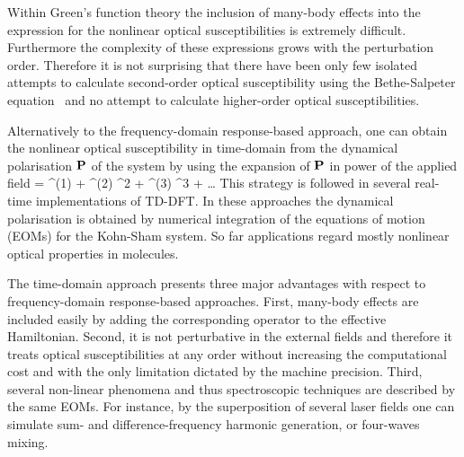 Within Green's function theory the inclusion of many-body effects into the expression for the nonlinear optical susceptibilities is extremely difficult. 
Furthermore the complexity of these expressions grows with the perturbation order. Therefore it is not surprising that there have been only few isolated attempts to calculate second-order optical susceptibility using the Bethe-Salpeter equation~\cite{Leitsmann2005,Chang2002} and no attempt to calculate higher-order optical susceptibilities.~\cite{PhysRevB.80.165318} 

Alternatively to the frequency-domain response-based approach, one can obtain the nonlinear optical susceptibility in time-domain from the dynamical polarisation ${\bf P}$ of the system by using the expansion of ${\bf P}$ in power of the applied field
\be
\label{eq:peopbf}
\PP= \chi^{(1)} \efield + \chi^{(2)} \efield^2 + \chi^{(3)} \efield^3 + \dots 
\ee 
This strategy is followed in several real-time implementations of TD-DFT\cite{PhysRevB.54.4484}. In these approaches the dynamical polarisation is obtained by numerical integration of the equations of motion (EOMs) for the Kohn-Sham system.\cite{takimoto:154114,castro:3425,meng:054110} So far applications regard mostly nonlinear optical properties in molecules.  

 
The time-domain approach presents three major advantages with respect to frequency-domain response-based approaches. First, many-body effects are included easily by adding the corresponding operator to the effective Hamiltonian. Second, it is not perturbative in the external fields and therefore it treats optical susceptibilities at any order without increasing the computational cost and with the only limitation dictated by the machine precision. Third, several non-linear phenomena and thus spectroscopic techniques are described by the same EOMs. For instance, by the superposition of several laser fields one can simulate sum- and difference-frequency harmonic generation, or four-waves mixing.\cite{boyd}


